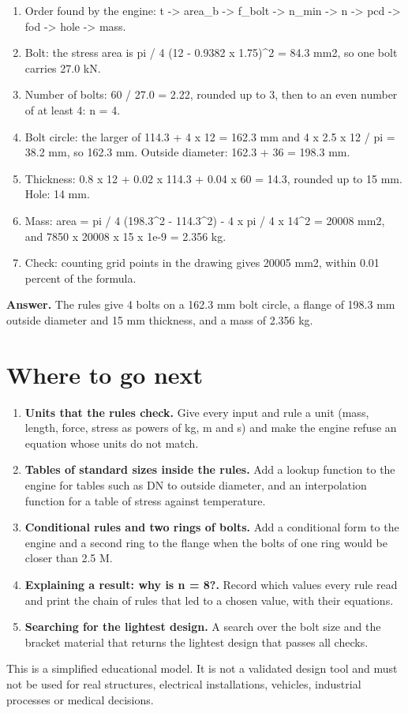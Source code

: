 \documentclass[11pt,a4paper]{article}
\begin{document}
\begin{enumerate}[nosep]
\item Order found by the engine: t -> area\_b -> f\_bolt -> n\_min -> n -> pcd -> fod -> hole -> mass.
\item Bolt: the stress area is pi / 4 (12 - 0.9382 x 1.75)\textasciicircum{}2 = 84.3 mm2, so one bolt carries 27.0 kN.
\item Number of bolts: 60 / 27.0 = 2.22, rounded up to 3, then to an even number of at least 4: n = 4.
\item Bolt circle: the larger of 114.3 + 4 x 12 = 162.3 mm and 4 x 2.5 x 12 / pi = 38.2 mm, so 162.3 mm. Outside diameter: 162.3 + 36 = 198.3 mm.
\item Thickness: 0.8 x 12 + 0.02 x 114.3 + 0.04 x 60 = 14.3, rounded up to 15 mm. Hole: 14 mm.
\item Mass: area = pi / 4 (198.3\textasciicircum{}2 - 114.3\textasciicircum{}2) - 4 x pi / 4 x 14\textasciicircum{}2 = 20008 mm2, and 7850 x 20008 x 15 x 1e-9 = 2.356 kg.
\item Check: counting grid points in the drawing gives 20005 mm2, within 0.01 percent of the formula.
\end{enumerate}
\textbf{Answer.} The rules give 4 bolts on a 162.3 mm bolt circle, a flange of 198.3 mm outside diameter and 15 mm thickness, and a mass of 2.356 kg.

\section*{Where to go next}
\begin{enumerate}[nosep]
\item \textbf{Units that the rules check.} Give every input and rule a unit (mass, length, force, stress as powers of kg, m and s) and make the engine refuse an equation whose units do not match.
\item \textbf{Tables of standard sizes inside the rules.} Add a lookup function to the engine for tables such as DN to outside diameter, and an interpolation function for a table of stress against temperature.
\item \textbf{Conditional rules and two rings of bolts.} Add a conditional form to the engine and a second ring to the flange when the bolts of one ring would be closer than 2.5 M.
\item \textbf{Explaining a result: why is n = 8?.} Record which values every rule read and print the chain of rules that led to a chosen value, with their equations.
\item \textbf{Searching for the lightest design.} A search over the bolt size and the bracket material that returns the lightest design that passes all checks.
\end{enumerate}

This is a simplified educational model. It is not a validated design tool and must not be used for real structures, electrical installations, vehicles, industrial processes or medical decisions.
\end{document}
